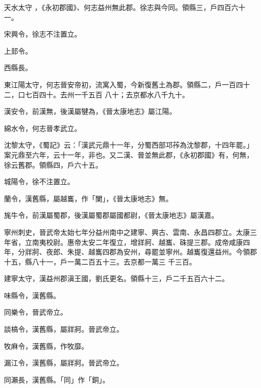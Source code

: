 \begin{pinyinscope}
天水太守
 ，《永初郡國》、何志益州無此郡。徐志與今同。領縣三，戶四百六十一。



 宋興令，徐志不注置立。


上邽令。


西縣長。



 東江陽太守，何志晉安帝初，流寓入蜀，今新復舊土為郡。領縣二，戶一百四十二，口七百四十。去州一千五百
 八十；去京都水八千九十。



 漢安令，前漢無，後漢屬犍為，《晉太康地志》屬江陽。



 綿水令，何志晉孝武立。



 沈黎太守，《蜀記》云：「漢武元鼎十一年，分蜀西部邛莋為沈黎郡，十四年罷。」案元鼎至六年，云十一年，非也。又二漢、晉並無此郡，《永初郡國》有，何無，徐云舊郡。領縣四，戶六十五。



 城陽令，徐不注置立。



 蘭令，漢舊縣，屬越巂，作「闌」，《晉太康地志》無。



 旄牛令，前漢屬蜀郡，後漢屬蜀郡屬國都尉，《晉太康地志》屬漢嘉。



 寧州刺史，晉武帝太始七年分益州南中之建寧、興古、雲南、永昌四郡立。太康三年省，立南夷校尉。惠帝太安二年復立，增牂牁、越巂、硃提三郡。成帝咸康四年，分牂牁、夜郎、朱提、越巂四郡為安州，尋罷並寧州。越巂復還益州。今領郡十五，縣八十一，戶一萬二百五十三。去京都一萬三
 千三百。



 建寧太守，漢益州郡滇王國，劉氏更名。領縣十三，戶二千五百六十二。



 味縣令，漢舊縣。



 同樂令，晉武帝立。



 談槁令，漢舊縣，屬牂牁。晉武帝立。



 牧麻令，漢舊縣，作牧靡。



 漏江令，漢舊縣，屬牂牁。晉武帝立。



 同瀨長，漢舊縣。「同」作「銅」。




\end{pinyinscope}
